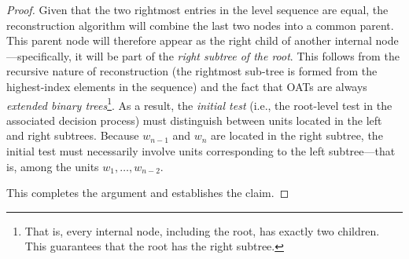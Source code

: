 \documentclass[10pt,a4paper]{amsart}
\begin{document}
\begin{proof}
Given that the two rightmost entries in the level sequence are equal, the reconstruction algorithm will combine the last two nodes into a common parent. This parent node will therefore appear as the right child of another internal node---specifically, it will be part of the \emph{right subtree of the root}. This follows from the recursive nature of reconstruction {(the rightmost sub-tree is formed from the highest-index elements in the sequence) and the fact that} OATs are always \emph{extended binary trees}\footnote{That is, every internal node, including the root, has exactly two children. {This guarantees that the root has the right subtree.}}. As a result, the \emph{initial test} (i.e., the root-level test in the associated decision process) must distinguish between units located in the left and right subtrees. Because \( w_{n-1} \) and \( w_n \) are located in the right subtree, the initial test must necessarily involve units corresponding to the left subtree---that is, among the units \( w_1, \dots, w_{n-2} \).

This completes the argument and establishes the claim.
\end{proof}
\end{document}
